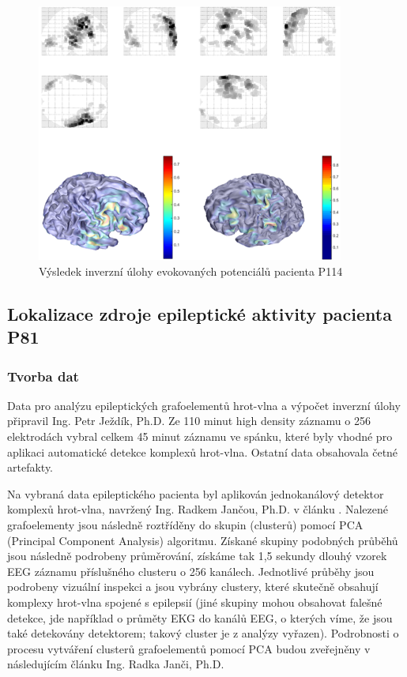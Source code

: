 \begin{figure}[!p]
\includegraphics[width=0.9\textwidth]{casti/aplikace/sep/P114.png}
\caption{Výsledek inverzní úlohy evokovaných potenciálů pacienta P114}
\label{sepP114}
\end{figure}




\newpage
\subsection{Lokalizace zdroje epileptické aktivity pacienta P81}

\subsubsection{Tvorba dat}
Data pro analýzu epileptických grafoelementů hrot-vlna a výpočet inverzní úlohy připravil Ing. Petr Ježdík, Ph.D. Ze 110 minut high density záznamu o 256 elektrodách vybral celkem 45 minut záznamu ve spánku, které byly vhodné pro aplikaci automatické detekce komplexů hrot-vlna. Ostatní data obsahovala četné artefakty.

Na vybraná data epileptického pacienta byl aplikován jednokanálový detektor komplexů hrot-vlna, navržený Ing. Radkem Jančou, Ph.D. v článku \cite{70}. Nalezené grafoelementy jsou následně roztříděny do skupin (clusterů) pomocí PCA (Principal Component Analysis) algoritmu. Získané skupiny podobných průběhů jsou následně podrobeny průměrování, získáme tak 1,5 sekundy dlouhý vzorek EEG záznamu příslušného clusteru o 256 kanálech. Jednotlivé průběhy jsou podrobeny vizuální inspekci a jsou vybrány clustery, které skutečně obsahují komplexy hrot-vlna spojené s epilepsií (jiné skupiny mohou obsahovat falešné detekce, jde například o průměty EKG do kanálů EEG, o kterých víme, že jsou také detekovány detektorem; takový cluster je z analýzy vyřazen). Podrobnosti o procesu vytváření clusterů grafoelementů pomocí PCA budou zveřejněny v následujícím článku Ing. Radka Janči, Ph.D. \cite{75}

